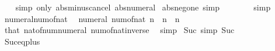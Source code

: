 \begin{isabellebody}
%
\isadelimproof
\ \ %
\endisadelimproof
%
\isatagproof
{}\isamarkupfalse%
\ {\isacharparenleft}{\kern0pt}simp\ only{\isacharcolon}{\kern0pt}\ abs{\isacharunderscore}{\kern0pt}minus{\isacharunderscore}{\kern0pt}cancel\ abs{\isacharunderscore}{\kern0pt}numeral{\isacharparenright}{\kern0pt}%
\endisatagproof
{\isafoldproof}%
%
\isadelimproof
\isanewline
%
\endisadelimproof
\isanewline
{}\isamarkupfalse%
\ abs{\isacharunderscore}{\kern0pt}neg{\isacharunderscore}{\kern0pt}one\ {\isacharbrackleft}{\kern0pt}simp{\isacharbrackright}{\kern0pt}{\isacharcolon}{\kern0pt}\ {\isachardoublequoteopen}{\isasymbar}{\isacharminus}{\kern0pt}\ {}{\isasymbar}\ {\isacharequal}{\kern0pt}\ {}{\isachardoublequoteclose}\isanewline
%
\isadelimproof
\ \ %
\endisadelimproof
%
\isatagproof
{}\isamarkupfalse%
\ simp%
\endisatagproof
{\isafoldproof}%
%
\isadelimproof
\isanewline
%
\endisadelimproof
\isanewline
{}\isamarkupfalse%
%
\isadelimdocument
%
\endisadelimdocument
%
\isatagdocument
%
\isamarkuptrue%
%
\endisatagdocument
{\isafolddocument}%
%
\isadelimdocument
%
\endisadelimdocument
{}\isamarkupfalse%
\ numeral{\isacharunderscore}{\kern0pt}num{\isacharunderscore}{\kern0pt}of{\isacharunderscore}{\kern0pt}nat{\isacharcolon}{\kern0pt}\isanewline
\ \ {\isachardoublequoteopen}numeral\ {\isacharparenleft}{\kern0pt}num{\isacharunderscore}{\kern0pt}of{\isacharunderscore}{\kern0pt}nat\ n{\isacharparenright}{\kern0pt}\ {\isacharequal}{\kern0pt}\ n{\isachardoublequoteclose}\ \ {\isachardoublequoteopen}n\ {\isachargreater}{\kern0pt}\ {}{\isachardoublequoteclose}\isanewline
%
\isadelimproof
\ \ %
\endisadelimproof
%
\isatagproof
{}\isamarkupfalse%
\ that\ nat{\isacharunderscore}{\kern0pt}of{\isacharunderscore}{\kern0pt}num{\isacharunderscore}{\kern0pt}numeral\ num{\isacharunderscore}{\kern0pt}of{\isacharunderscore}{\kern0pt}nat{\isacharunderscore}{\kern0pt}inverse\ \isamarkupfalse%
\ simp%
\endisatagproof
{\isafoldproof}%
%
\isadelimproof
\isanewline
%
\endisadelimproof
\isanewline
{}\isamarkupfalse%
\ Suc{\isacharunderscore}{\kern0pt}{}\ {\isacharbrackleft}{\kern0pt}simp{\isacharbrackright}{\kern0pt}{\isacharcolon}{\kern0pt}\ {\isachardoublequoteopen}Suc\ {}\ {\isacharequal}{\kern0pt}\ {}{\isachardoublequoteclose}\isanewline
%
\isadelimproof
\ \ %
\endisadelimproof
%
\isatagproof
{}\isamarkupfalse%
\ Suc{\isacharunderscore}{\kern0pt}eq{\isacharunderscore}{\kern0pt}plus{}\ \isamarkupfalse%

\end{isabellebody}
